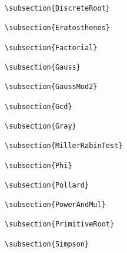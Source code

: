 {\begin{verbatim}
\subsection{DiscreteRoot}

\subsection{Eratosthenes}

\subsection{Factorial}

\subsection{Gauss}

\subsection{GaussMod2}

\subsection{Gcd}

\subsection{Gray}

\subsection{MillerRabinTest}

\subsection{Phi}

\subsection{Pollard}

\subsection{PowerAndMul}

\subsection{PrimitiveRoot}

\subsection{Simpson}




\end{verbatim}}
